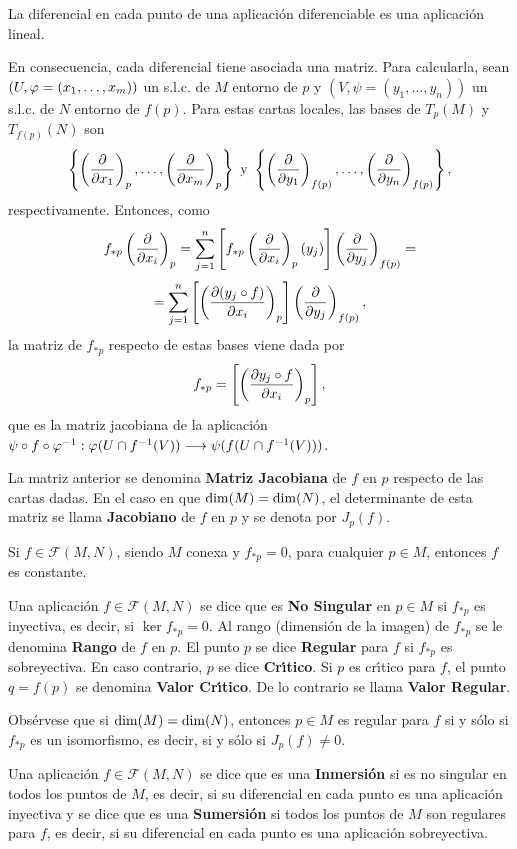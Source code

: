 \documentclass[cursovd_portada.tex]{subfiles}
\begin{document}
\begin{prop}
La diferencial en cada punto de una aplicaci\'{o}n diferenciable es una aplicaci\'{o}n lineal.
\end{prop}
En consecuencia, cada diferencial tiene asociada una matriz. Para calcularla, sean $(U,\varphi=(x_1,\dots ,x_m))$ un
s.l.c. de $M$ entorno de $p$ y $(V,\psi=(y_1,\dots ,y_n))$ un s.l.c. de $N$ entorno de $f(p)$. Para estas cartas
locales, las bases de $T_p(M)$ y $T_{f(p)}(N)$ son
$$\left\{\left(\displaystyle{\frac{\partial}{\partial x_1}}\right)_p,\dots ,\left(\displaystyle{\frac{\partial}{\partial x_m}}\right)_p\right\}\mbox{ }{\rm y}\mbox{
}\left\{\left(\displaystyle{\frac{\partial}{\partial y_1}}\right)_{f(p)},\dots ,\left(\displaystyle{\frac{\partial}{\partial y_n}}\right)_{f(p)}\right\},$$ respectivamente. Entonces,
como
$$f_{*p}\left(\displaystyle{\frac{\partial}{\partial x_i}}\right)_p=\sum_{j=1}^n\left[f_{*p}\left(\displaystyle{\frac{\partial}{\partial x_i}}\right)_p(y_j)\right]\left(\displaystyle{\frac{\partial}{\partial y_j}}
\right)_{f(p)}=$$ $$=\sum_{j=1}^n\left[\left(\displaystyle{\frac{\partial (y_j\circ f)}{\partial x_i}}\right)_p\right]\left(\displaystyle{\frac{\partial}{\partial y_j}}
\right)_{f(p)},$$ la matriz de $f_{*p}$ respecto de estas bases viene dada por
$$f_{*p}=\left[\left(\displaystyle{\frac{\partial y_j\circ f}{\partial x_i}}\right)_p\right],$$
que es la matriz jacobiana de la aplicaci\'{o}n $\psi\circ f\circ\varphi^{-1}:\varphi(U\cap f^{-1}(V))\longrightarrow\psi(f(U\cap
f^{-1}(V)))$.
\begin{defi}
La matriz anterior se denomina {\bf Matriz Jacobiana} de $f$ en $p$ respecto de las cartas dadas. En el caso en
que ${\rm dim}(M)={\rm dim}(N)$, el determinante de esta matriz se llama {\bf Jacobiano} de $f$ en $p$ y se denota
por $J_p(f)$.
\end{defi}
\begin{prop} Si $f\in\mathcal{F}(M,N)$, siendo $M$ conexa y $f_{*p}=0$, para cual\-quier $p\in M$, entonces $f$
es constante.
\end{prop}
\begin{defi}
Una aplicaci\'{o}n $f\in\mathcal{F}(M,N)$ se dice que es {\bf No Singular} en $p\in M$ si $f_{*p}$ es inyectiva, es
decir, si $\ker f_{*p}=0$. Al rango (dimensi\'{o}n de la imagen) de $f_{*p}$ se le denomina {\bf Rango} de $f$ en $p$.
El punto $p$ se dice {\bf Regular} para $f$ si $f_{*p}$ es sobreyectiva. En caso contrario, $p$ se dice {\bf
Cr\'{\i}tico}. Si $p$ es cr\'{\i}tico para $f$, el punto $q=f(p)$ se denomina {\bf Valor Cr\'{\i}tico}. De lo contrario se llama
{\bf Valor Regular}.
\end{defi}
Obs\'{e}rvese que si ${\rm dim}(M)={\rm dim}(N)$, entonces $p\in M$ es regular para $f$ si y s\'{o}lo si $f_{*p}$ es un
isomorfismo, es decir, si y s\'{o}lo si $J_p(f)\neq 0$.
\begin{defi}
Una aplicaci\'{o}n $f\in\mathcal{F}(M,N)$ se dice que es una {\bf Inmersi\'{o}n} si es no singular en todos los puntos de
$M$, es decir, si su diferencial en cada punto es una aplicaci\'{o}n inyectiva y se dice que es una {\bf Sumersi\'{o}n} si
todos los puntos de $M$ son regulares para $f$, es decir, si su diferencial en cada punto es una aplicaci\'{o}n
sobreyectiva.
\end{defi}
\end{document}

